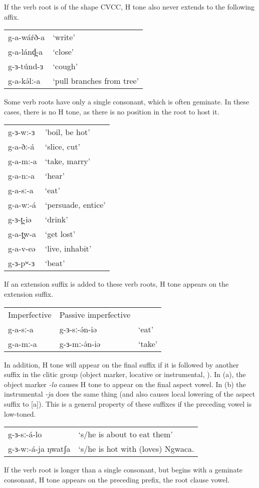 If the verb root is of the shape CVCC, H tone also never extends to the following affix. 

\ea 
\begin{tabular}[t]{ll}
g-a-wáŕð-a	&	‘write’\\
g-a-lánd̪-a	&	‘close’\\
g-ɜ-túnd-ɜ	&	‘cough’\\
g-a-kə́lː-a	&	‘pull branches from tree’\\	
\end{tabular}
\z

Some verb roots have only a single consonant, which is often geminate. In these cases, there is no H tone, as there is no position in the root to host it. 

\ea  
\begin{tabular}[t]{ll} %
g-ɜ-w:-ɜ	&	'boil, be hot' \\
g-a-ðː-á	&	‘slice, cut’\\
g-a-m:-a	&	‘take, marry’\\
g-a-n:-a	&	‘hear’\\
g-a-sː-a	&	‘eat’\\
g-a-wː-á	&	‘persuade, entice’\\
g-ɜ-t̪-iə	&	‘drink’\\
g-a-t̪w-a	&	‘get lost’\\
g-a-v-eə	&	‘live, inhabit’\\
g-ɜ-pʷ-ɜ	&	‘beat’
\end{tabular}
\z 
If an extension suffix is added to these verb roots, H tone appears on the extension suffix. 

\ea 
\begin{tabular}[t]{lll}
Imperfective	&	Passive imperfective 	\\
g-a-sː-a 	&	g-ɜ-sː-ə́n-iə	&	‘eat’\\
g-a-mː-a	&	g-ɜ-mː-ə́n-iə	&	‘take’\\ 	
\end{tabular}
\z 
In addition, H tone will appear on the final suffix if it is followed by another suffix in the clitic group (object marker, locative or instrumental, ). In (a), the object marker \textit{-lo} causes H tone to appear on the final aspect vowel. In (b) the instrumental \textit{-ja} does the same thing (and also causes local lowering of the aspect suffix to [a]). This is a general property of these suffixes if the preceding vowel is low-toned. 

\ea  	
\begin{tabular}[t]{ll}
g-ɜ-sː-á-lo			&	‘s/he is about to eat them’\\
g-ɜ-w:-á-ja ŋwatʃa	&	‘s/he is hot with (loves) Ngwaca.\\ 
\end{tabular}
\z 
If the verb root is longer than a single consonant, but begins with a geminate consonant, H tone appears on the preceding prefix, the root clause vowel. 

